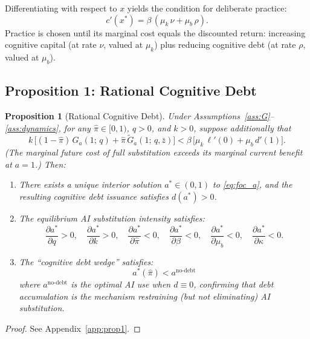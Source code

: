 \documentclass[12pt]{article}
\newtheorem{proposition}{Proposition}
\newcommand{\hpi}{\hat{\pi}}
\begin{document}
Differentiating with respect to $x$ yields the condition for deliberate practice:
\begin{equation}
c'(x^*) = \beta\,(\mu_k\,\nu + \mu_b\,\rho).
\label{eq:foc_x}
\end{equation}
Practice is chosen until its marginal cost equals the discounted return: increasing
cognitive capital (at rate $\nu$, valued at $\mu_k$) plus reducing cognitive debt
(at rate $\rho$, valued at $\mu_b$).

\subsection{Proposition 1: Rational Cognitive Debt}

\begin{proposition}[Rational Cognitive Debt]
\label{prop:individual}
Under Assumptions~\ref{ass:G}--\ref{ass:dynamics}, for any $\hpi \in [0,1)$,
$q > 0$, and $k > 0$, suppose additionally that
\begin{equation}
k\,\bigl[(1-\hpi)\,G_a(1;\,q) + \hpi\,\tilde{G}_a(1;\,q,\bar{z})\bigr]
< \beta\,\bigl[\mu_k\,\ell'(0) + \mu_b\,d'(1)\bigr].
\label{eq:boundary1}
\end{equation}
(The marginal future cost of full substitution exceeds its marginal current benefit
at $a=1$.) Then:
\begin{enumerate}
\item[\emph{(i)}] There exists a unique interior solution $a^* \in (0,1)$ to
\eqref{eq:foc_a}, and the resulting cognitive debt issuance satisfies $d(a^*) > 0$.
\item[\emph{(ii)}] The equilibrium AI substitution intensity satisfies:
\[
\frac{\partial a^*}{\partial q} > 0, \quad
\frac{\partial a^*}{\partial k} > 0, \quad
\frac{\partial a^*}{\partial \hpi} < 0, \quad
\frac{\partial a^*}{\partial \beta} < 0, \quad
\frac{\partial a^*}{\partial \mu_b} < 0, \quad
\frac{\partial a^*}{\partial \kappa} < 0.
\]
\item[\emph{(iii)}] The ``cognitive debt wedge'' satisfies:
\[
a^*(\hpi) < a^{\text{no-debt}}
\]
where $a^{\text{no-debt}}$ is the optimal AI use when $d \equiv 0$, confirming that
debt accumulation is the mechanism restraining (but not eliminating) AI substitution.
\end{enumerate}
\end{proposition}

\begin{proof}
See Appendix~\ref{app:prop1}.
\end{proof}
\end{document}
